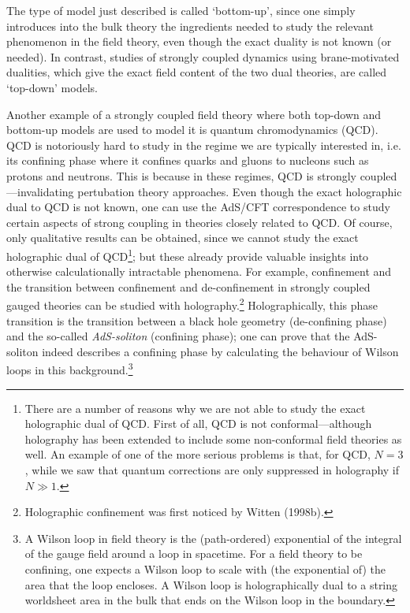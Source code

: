 \documentclass[12pt]{article}
\renewcommand{\^}[1]{\hat{#1}}
\begin{document}

The type of model just described is called `bottom-up', since one simply introduces into the bulk theory the ingredients needed to study the relevant phenomenon in the field theory, even though the exact duality is not known (or needed). In contrast, studies of strongly coupled dynamics using brane-motivated dualities, which give the exact field content of the two dual theories, are called `top-down' models.

Another example of a strongly coupled field theory where both top-down and bottom-up models are used to model it is quantum chromodynamics (QCD). QCD is notoriously hard to study in the regime we are typically interested in, i.e. its confining phase where it confines quarks and gluons to nucleons such as protons and neutrons. This is because in these regimes, QCD is strongly coupled---invalidating pertubation theory approaches. Even though the exact holographic dual to QCD is not known, one can use the AdS/CFT correspondence to study certain aspects 
of strong coupling in theories closely related to QCD. Of course, only qualitative results can be obtained, since we cannot study the exact holographic dual of QCD\footnote{There are a number of reasons why we are not able to study the exact holographic dual of QCD. First of all, QCD is not conformal---although holography has been extended to include some non-conformal field theories as well. An example of one of the more serious problems is that, for QCD, $N=3$, while we saw that quantum corrections are only suppressed in holography if $N\gg 1$.}; but these already provide valuable insights into otherwise calculationally intractable phenomena. For example, confinement and the transition between confinement and de-confinement in strongly coupled gauged theories can be studied with holography.\footnote{Holographic confinement was first noticed by Witten (1998b).} Holographically, this phase transition is the transition between a black hole geometry (de-confining phase) and the so-called \emph{AdS-soliton} (confining phase); one can prove that the AdS-soliton indeed describes a confining phase by calculating the behaviour of Wilson loops in this background.\footnote{A Wilson loop in field theory is the (path-ordered) exponential of the integral of the gauge field around a loop in spacetime. For a field theory to be confining, one expects a Wilson loop to scale with (the exponential of) the area that the loop encloses. A Wilson loop is holographically dual to a string worldsheet area in the bulk that ends on the Wilson loop in the boundary.}
\end{document}
